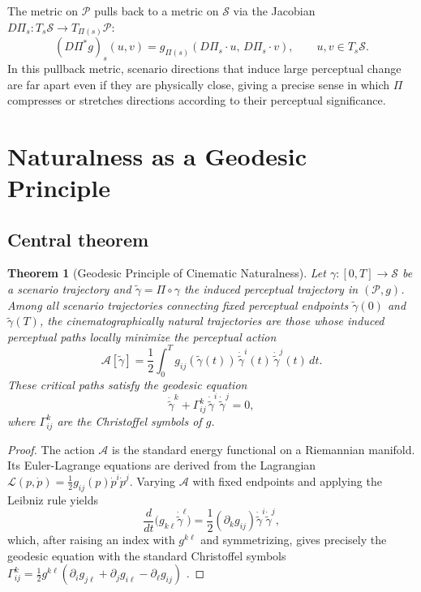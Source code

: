\documentclass[12pt,a4paper]{article}
\theoremstyle{plain}
\newtheorem{theorem}{Theorem}[section]
\theoremstyle{definition}
\begin{document}
The metric on $\mathcal{P}$ pulls back to a metric on $\mathcal{S}$ via the
Jacobian $D\Pi_s: T_s\mathcal{S}\to T_{\Pi(s)}\mathcal{P}$:
\[
(D\Pi^*g)_s(u,v) = g_{\Pi(s)}(D\Pi_s\cdot u,\,D\Pi_s\cdot v),
\qquad u,v\in T_s\mathcal{S}.
\]
In this pullback metric, scenario directions that induce large perceptual
change are far apart even if they are physically close, giving a precise
sense in which $\Pi$ compresses or stretches directions according to their
perceptual significance.

\section{Naturalness as a Geodesic Principle}
\label{sec:geodesic}

\subsection{Central theorem}

\begin{theorem}[Geodesic Principle of Cinematic Naturalness]
\label{thm:geodesic}
Let $\gamma:[0,T]\to\mathcal{S}$ be a scenario trajectory and
$\tilde\gamma = \Pi\circ\gamma$ the induced perceptual trajectory in
$(\mathcal{P},g)$. Among all scenario trajectories connecting fixed perceptual
endpoints $\tilde\gamma(0)$ and $\tilde\gamma(T)$, the
\emph{cinematographically natural} trajectories are those whose induced
perceptual paths locally minimize the perceptual action
\[
\mathcal{A}[\tilde\gamma]
= \frac{1}{2}\int_0^T
g_{ij}(\tilde\gamma(t))\,\dot{\tilde\gamma}^i(t)\,\dot{\tilde\gamma}^j(t)\,dt.
\]
These critical paths satisfy the geodesic equation
\[
\ddot{\tilde\gamma}^k
+ \Gamma^k_{ij}\,\dot{\tilde\gamma}^i\,\dot{\tilde\gamma}^j = 0,
\]
where $\Gamma^k_{ij}$ are the Christoffel symbols of $g$.
\end{theorem}

\begin{proof}
The action $\mathcal{A}$ is the standard energy functional on a Riemannian
manifold. Its Euler-Lagrange equations are derived from the Lagrangian
$\mathcal{L}(p,\dot p)=\tfrac{1}{2}g_{ij}(p)\dot p^i\dot p^j$. Varying
$\mathcal{A}$ with fixed endpoints and applying the Leibniz rule yields
\[
\frac{d}{dt}\bigl(g_{k\ell}\dot{\tilde\gamma}^\ell\bigr)
= \frac{1}{2}(\partial_k g_{ij})\dot{\tilde\gamma}^i\dot{\tilde\gamma}^j,
\]
which, after raising an index with $g^{k\ell}$ and symmetrizing, gives
precisely the geodesic equation with the standard Christoffel symbols
$\Gamma^k_{ij} = \tfrac{1}{2}g^{k\ell}
(\partial_i g_{j\ell}+\partial_j g_{i\ell}-\partial_\ell g_{ij})$
\cite{docarmo1992}.
\end{proof}
\end{document}
